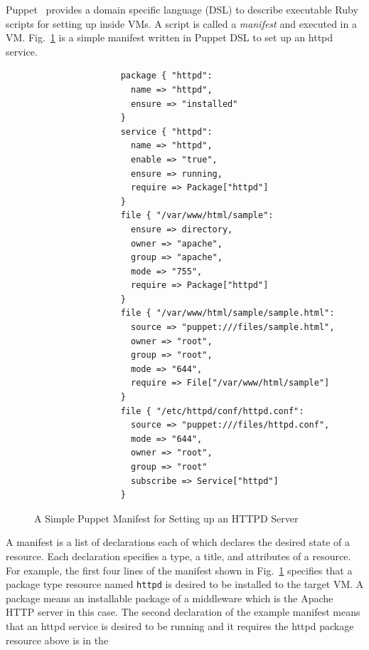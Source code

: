 \documentclass[12pt]{report}
\begin{document}
Puppet~\cite{Puppet} provides a domain specific language (DSL) to
describe executable Ruby~\cite{Ruby} scripts for setting up inside
VMs. A script is called a {\it manifest} and executed in a VM.
Fig.~\ref{fig:PuppetExample} is a simple manifest written in Puppet
DSL to set up an httpd service.
\begin{figure}
\small
\begin{verbatim}
                 package { "httpd":
                   name => "httpd",
                   ensure => "installed"
                 }
                 service { "httpd":
                   name => "httpd",
                   enable => "true",
                   ensure => running,
                   require => Package["httpd"]
                 }
                 file { "/var/www/html/sample":
                   ensure => directory,
                   owner => "apache",
                   group => "apache",
                   mode => "755",
                   require => Package["httpd"]
                 }
                 file { "/var/www/html/sample/sample.html":
                   source => "puppet:///files/sample.html",
                   owner => "root",
                   group => "root",
                   mode => "644",
                   require => File["/var/www/html/sample"]
                 }
                 file { "/etc/httpd/conf/httpd.conf":
                   source => "puppet:///files/httpd.conf",
                   mode => "644",
                   owner => "root",
                   group => "root"
                   subscribe => Service["httpd"]
                 }
\end{verbatim}
\normalsize
\vspace{-0.6cm}
\caption{A Simple Puppet Manifest for Setting up an HTTPD Server}
\label{fig:PuppetExample}
\end{figure}
A manifest is a list of declarations each of which declares the
desired state of a resource. Each declaration specifies a type, a
title, and attributes of a resource. For example, the first four lines
of the manifest shown in Fig.~\ref{fig:PuppetExample} specifies that a
package type resource named {\tt httpd} is desired to be installed to
the target VM. A package means an installable package of a middleware
which is the Apache HTTP server in this case.  The second declaration
of the example manifest means that an httpd service is desired to be
running and it requires the httpd package resource above is in the
\end{document}
